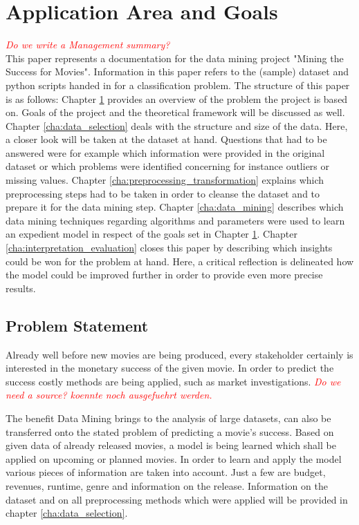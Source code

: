 \chapter{Application Area and Goals}
\label{cha:area_goals}
\textcolor{red}{\textit{Do we write a Management summary?}}\\
This paper represents a documentation for the data mining project "Mining the Success for Movies". Information in this paper refers to the (sample) dataset and python scripts handed in for a classification problem. The structure of this paper is as follows: Chapter \ref{cha:area_goals} provides an overview of the problem the project is based on. Goals of the project and the theoretical framework will be discussed as well. Chapter \ref{cha:data_selection} deals with the structure and size of the data. Here, a closer look will be taken at the dataset at hand. Questions that had to be answered were for example which information were provided in the original dataset or which problems were identified concerning for instance outliers or missing values. Chapter \ref{cha:preprocessing_transformation} explains which preprocessing steps had to be taken in order to cleanse the dataset and to prepare it for the data mining step. Chapter \ref{cha:data_mining} describes which data mining techniques regarding algorithms and parameters were used to learn an expedient model in respect of the goals set in Chapter \ref{cha:area_goals}. Chapter \ref{cha:interpretation_evaluation} closes this paper by describing which insights could be won for the problem at hand. Here, a critical reflection is delineated how the model could be improved further in order to provide even more precise results.

\section{Problem Statement}
Already well before new movies are being produced, every stakeholder certainly is interested in the monetary success of the given movie. In order to predict the success costly methods are being applied, such as market investigations. \textcolor{red}{\textit{Do we need a source? koennte noch ausgefuehrt werden.}}

The benefit Data Mining brings to the analysis of large datasets, can also be transferred onto the stated problem of predicting a movie's success. Based on given data of already released movies, a model is being learned which shall be applied on upcoming or planned movies. In order to learn and apply the model various pieces of information are taken into account. Just a few are budget, revenues, runtime, genre and information on the release. Information on the dataset and on all preprocessing methods which were applied will be provided in chapter \ref{cha:data_selection}.

